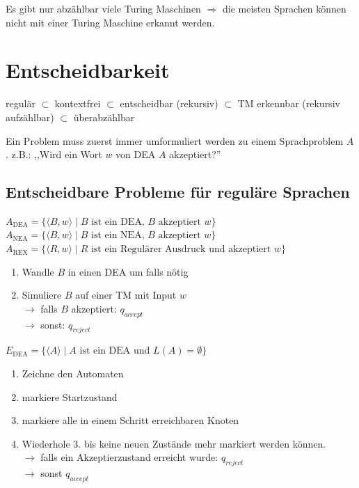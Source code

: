 \documentclass[a4paper]{article}
\begin{document}
	Es gibt nur abzählbar viele Turing Maschinen $\Rightarrow$ die meisten Sprachen können nicht mit einer Turing Maschine erkannt werden.

	
	
\newpage
\section{Entscheidbarkeit}


	\begin{fmerke}
	regulär $\subset$ kontextfrei $\subset$ entscheidbar (rekursiv) $\subset$ TM erkennbar (rekursiv aufzählbar) $\subset$ überabzählbar
	\end{fmerke}
	
	Ein Problem muss zuerst immer umformuliert werden zu einem Sprachproblem $A$.
	z.B.: ,,Wird ein Wort $w$ von DEA $A$ akzeptiert?''

\subsection{Entscheidbare Probleme für reguläre Sprachen}
	\begin{falgo}[Akzeptanzproblem]
		$A_{\text{DEA}} = \{ \langle B,w \rangle \mid \text{$B$ ist ein DEA, $B$ akzeptiert $w$} \}$ \\
		$A_{\text{NEA}} = \{ \langle B,w \rangle \mid \text{$B$ ist ein NEA, $B$ akzeptiert $w$} \}$ \\
		$A_{\text{REX}} = \{ \langle R,w \rangle \mid \text{$R$ ist  ein Regulärer Ausdruck und akzeptiert $w$} \}$
		\begin{enumerate}
			\item Wandle $B$ in einen DEA um falls nötig
			\item Simuliere $B$ auf einer TM mit Input $w$ \\
			$\rightarrow$ falls $B$ akzeptiert: $q_{accept}$ \\
			$\rightarrow$ sonst: $q_{reject}$
		\end{enumerate}
	\end{falgo}
	
	\begin{falgo}[Leerheitsproblem]
		 $E_{\text{DEA}} = \{ \langle A \rangle \mid \text{$A$ ist ein DEA und $L(A)=\emptyset$} \}$
		 \begin{enumerate}
			\item Zeichne den Automaten
			\item markiere Startzustand
			\item markiere alle in einem Schritt erreichbaren Knoten
			\item Wiederhole 3. bis keine neuen Zustände mehr markiert werden können.\\
			$\rightarrow$ falls ein Akzeptierzustand erreicht wurde: $q_{reject}$ \\
			$\rightarrow$ sonst $q_{accept}$
		\end{enumerate}
	\end{falgo}
	
\end{document}
